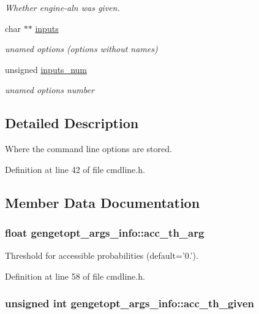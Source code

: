 \begin{DoxyCompactItemize}
\begin{DoxyCompactList}\small\item\em Whether engine-\/aln was given. \end{DoxyCompactList}\item 
char $\ast$$\ast$ \hyperlink{structgengetopt__args__info_a6fe9c1a32bc4c64a2ca4e3cfce05b147}{inputs}
\begin{DoxyCompactList}\small\item\em unamed options (options without names) \end{DoxyCompactList}\item 
unsigned \hyperlink{structgengetopt__args__info_a3d69c180d5ac0b1124fd9a6fe680706c}{inputs\+\_\+num}
\begin{DoxyCompactList}\small\item\em unamed options number \end{DoxyCompactList}\end{DoxyCompactItemize}


\subsection{Detailed Description}
Where the command line options are stored. 

Definition at line 42 of file cmdline.\+h.



\subsection{Member Data Documentation}
\hypertarget{structgengetopt__args__info_add7c709ed6c1601e389c7373250e4117}{
\subsubsection[{acc\+\_\+th\+\_\+arg}]{\setlength{\rightskip}{0pt plus 5cm}float gengetopt\+\_\+args\+\_\+info\+::acc\+\_\+th\+\_\+arg}}\label{structgengetopt__args__info_add7c709ed6c1601e389c7373250e4117}


Threshold for accessible probabilities (default='0.'). 



Definition at line 58 of file cmdline.\+h.

\hypertarget{structgengetopt__args__info_aceb5489e00facac0f7469af450fecc5f}{
\subsubsection[{acc\+\_\+th\+\_\+given}]{\setlength{\rightskip}{0pt plus 5cm}unsigned int gengetopt\+\_\+args\+\_\+info\+::acc\+\_\+th\+\_\+given}}\label{structgengetopt__args__info_aceb5489e00facac0f7469af450fecc5f}


